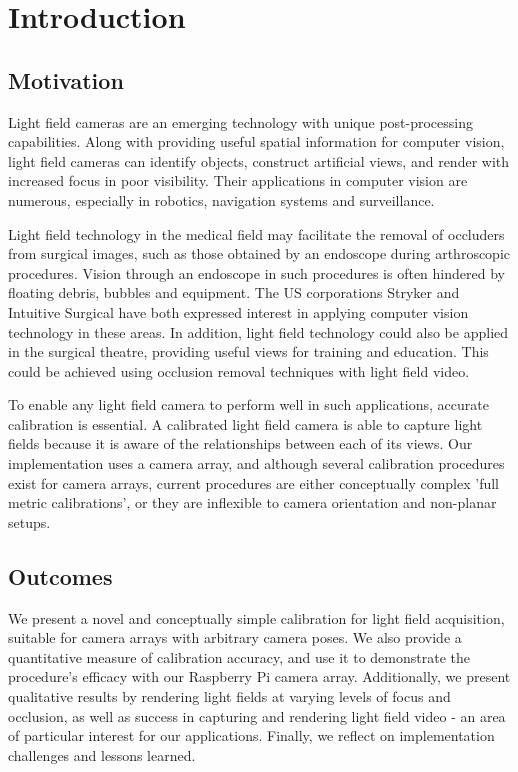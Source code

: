 \documentclass[../main.tex]{subfiles}
\begin{document}
\section{Introduction} \label{sec:introduction}
\subsection{Motivation}
Light field cameras are an emerging technology with unique post-processing capabilities. Along with providing useful spatial information for computer vision, light field cameras can identify objects, construct artificial views, and render with increased focus in poor visibility. Their applications in computer vision are numerous, especially in robotics, navigation systems and surveillance.

Light field technology in the medical field may facilitate the removal of occluders from surgical images, such as those obtained by an endoscope during arthroscopic procedures. Vision through an endoscope in such procedures is often hindered by floating debris, bubbles and equipment. The US corporations Stryker and Intuitive Surgical have both expressed interest in applying computer vision technology in these areas. In addition, light field technology could also be applied in the surgical theatre, providing useful views for training and education. This could be achieved using occlusion removal techniques with light field video.

To enable any light field camera to perform well in such applications, accurate calibration is essential. A calibrated light field camera is able to capture light fields because it is aware of the relationships between each of its views. Our implementation uses a camera array, and although several calibration procedures exist for camera arrays, current procedures are either conceptually complex 'full metric calibrations', or they are inflexible to camera orientation and non-planar setups.

\subsection{Outcomes}
We present a novel and conceptually simple calibration for light field acquisition, suitable for camera arrays with arbitrary camera poses. We also provide a quantitative measure of calibration accuracy, and use it to demonstrate the procedure's efficacy with our Raspberry Pi camera array. Additionally, we present qualitative results by rendering light fields at varying levels of focus and occlusion, as well as success in capturing and rendering light field video - an area of particular interest for our applications. Finally, we reflect on implementation challenges and lessons learned.
\end{document}
